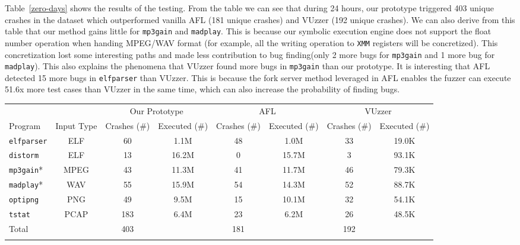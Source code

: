 Table~\ref{zero-days} shows the results of the testing. 
From the table we can see that during 24 hours, our prototype triggered 403 unique crashes in the dataset which outperformed vanilla AFL (181 unique crashes) and VUzzer (192 unique crashes). 
We can also derive from this table that our method gains little for \texttt{mp3gain} and \texttt{madplay}. This is because our symbolic execution engine does not support the float number operation when handing MPEG/WAV format (for example, all the writing operation to \texttt{XMM} registers will be concretized). This concretization lost some interesting paths and made less contribution to bug finding(only 2 more bugs for \texttt{mp3gain} and 1 more bug for \texttt{madplay}). 
This also explains the phenomena that VUzzer found more bugs in \texttt{mp3gain} than our prototype. 
It is interesting that AFL detected 15 more bugs in \texttt{elfparser} than VUzzer. This is because the fork server method leveraged in AFL enables the fuzzer can execute 51.6x more test cases than VUzzer in the same time, which can also increase the probability of finding bugs.

\begin{table}[!t]
{\begin{tabular}{lccccccc}\toprule
	& & \multicolumn{2}{c}{Our Prototype} & \multicolumn{2}{c}{AFL} & \multicolumn{2}{c}{VUzzer}\\
		    Program & Input Type & Crashes (\#) & Executed (\#)& Crashes (\#) & Executed  (\#) & Crashes (\#) & Executed (\#) \\
\midrule
\texttt{elfparser}  & ELF	& 60 &   1.1M & 48   & 1.0M   & 33 & 19.0K    \\
		\texttt{distorm}    & ELF    & 13 &   16.2M   & 0   & 15.7M    & 3 & 93.1K    \\
		\texttt{mp3gain}*   & MPEG	& 43 &   11.3M  & 41  &  11.7M   & 46 &  79.3K  \\
		\texttt{madplay}*   & WAV	& 55 &   15.9M  & 54  & 14.3M    & 52 & 88.7K   \\
		\texttt{optipng}    & PNG    & 49 &   9.5M & 15  &  10.1M   & 32 & 54.1K   \\
		\texttt{tstat}      & PCAP   & 183&   6.4M & 23 &  6.2M   & 26 & 48.5K   \\
		\midrule
		Total      &        & 403   &  & 181 &  & 192 &\\
\botrule
\end{tabular}}{}
\end{table}

